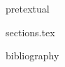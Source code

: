 \documentclass[11pt]{article}
\begin{document}
{pretextual}

\clearpage

{sections.tex}

{bibliography}


\end{document}
